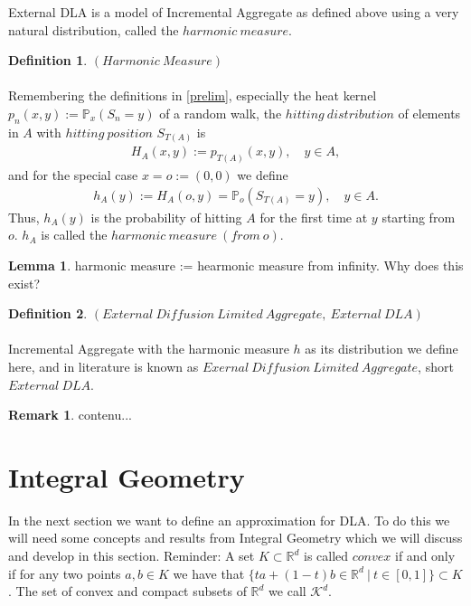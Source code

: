 \documentclass[12pt,a4paper]{scrartcl}
\numberwithin{equation}{section}
\newcommand{\R}{\mathbb{R}} %
\newcommand{\K}{\mathcal{K}}
\numberwithin{equation}{section}
\theoremstyle{definition}
\newtheorem{lemma}{Lemma}
\newtheorem{definition}{Definition}
\newtheorem{remark}{Remark}
\begin{document}
External DLA is a model of Incremental Aggregate as defined above using a very natural distribution, called the $\mathit{harmonic\ measure}$. 

\begin{definition} $\mathit{(Harmonic\ Measure)}$\\
	\\
	Remembering the definitions in \eqref{prelim}, especially the heat kernel $p_n(x,y):=\mathbb{P}_x(S_n=y)$ of a random walk, the $\mathit{hitting\ distribution}$ of elements in $A$ with $\mathit{hitting\ position}$ $S_{T(A)}$ is 
	\begin{align*}
	H_A(x,y) := p_{T(A)}(x,y),\quad y\in A, 
	\end{align*}
	and for the special case $x=o:=(0,0)$ we define
	\begin{align*}
	h_A(y) := H_A(o,y) = \mathbb{P}_o(S_{T(A)}=y),\quad y\in A.
	\end{align*}
	Thus, $h_A(y)$ is the probability of hitting $A$ for the first time at $y$ starting from $o$. $h_A$ is called the $\mathit{harmonic\ measure\ (from\ o)}$.
\end{definition}

\begin{lemma}
	harmonic measure := hearmonic measure from infinity. Why does this exist?
\end{lemma}

\begin{definition} $\mathit{(External\ Diffusion\ Limited\ Aggregate,\ External\ DLA)}$\\
	\\ Incremental Aggregate with the harmonic measure $h$ as its distribution we define here, and in literature is known as $\mathit{Exernal\ Diffusion\ Limited\ Aggregate}$, short $\mathit{External\ DLA}$.
\end{definition}

\begin{remark}
	contenu...
\end{remark}

\newpage
\section{Integral Geometry}

In the next section we want to define an approximation for DLA. To do this we will need some concepts and results from Integral Geometry which we will discuss and develop in this section. Reminder: A set $K\subset \mathbb{R}^d$ is called $\mathit{convex}$ if and only if for any two points $a,b\in K$ we have that $\{ta + (1-t)b \in \mathbb{R}^d\ |\ t\in [0,1]\}\subset K$. The set of convex and compact subsets of $\R^d$ we call $\K^d$. 
\end{document}
